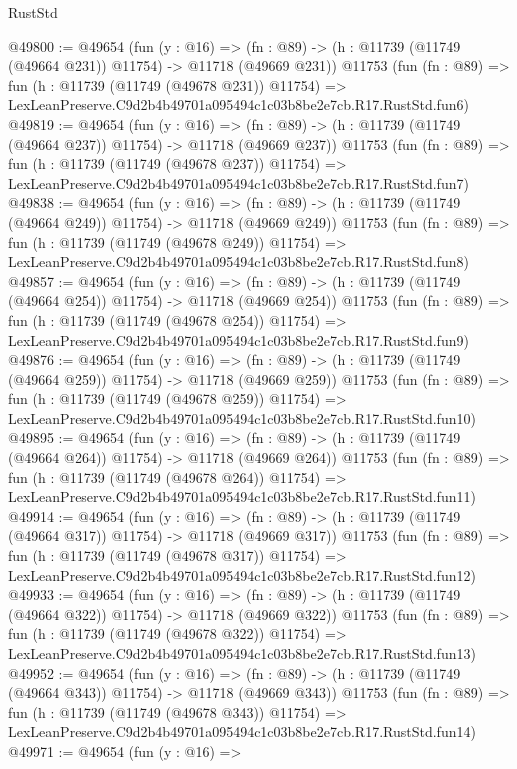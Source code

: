 \begin{lexlean}{RustStd}
\begin{coremodule}
@49800 := @49654
    (fun (y : @16) =>
    (fn : @89) -> (h : @11739 (@11749 (@49664 @231)) @11754) -> @11718 (@49669 @231))
    @11753
    (fun (fn : @89) =>
    fun (h : @11739 (@11749 (@49678 @231)) @11754) =>
    LexLeanPreserve.C9d2b4b49701a095494c1c03b8be2e7cb.R17.RustStd.fun6)
@49819 := @49654
    (fun (y : @16) =>
    (fn : @89) -> (h : @11739 (@11749 (@49664 @237)) @11754) -> @11718 (@49669 @237))
    @11753
    (fun (fn : @89) =>
    fun (h : @11739 (@11749 (@49678 @237)) @11754) =>
    LexLeanPreserve.C9d2b4b49701a095494c1c03b8be2e7cb.R17.RustStd.fun7)
@49838 := @49654
    (fun (y : @16) =>
    (fn : @89) -> (h : @11739 (@11749 (@49664 @249)) @11754) -> @11718 (@49669 @249))
    @11753
    (fun (fn : @89) =>
    fun (h : @11739 (@11749 (@49678 @249)) @11754) =>
    LexLeanPreserve.C9d2b4b49701a095494c1c03b8be2e7cb.R17.RustStd.fun8)
@49857 := @49654
    (fun (y : @16) =>
    (fn : @89) -> (h : @11739 (@11749 (@49664 @254)) @11754) -> @11718 (@49669 @254))
    @11753
    (fun (fn : @89) =>
    fun (h : @11739 (@11749 (@49678 @254)) @11754) =>
    LexLeanPreserve.C9d2b4b49701a095494c1c03b8be2e7cb.R17.RustStd.fun9)
@49876 := @49654
    (fun (y : @16) =>
    (fn : @89) -> (h : @11739 (@11749 (@49664 @259)) @11754) -> @11718 (@49669 @259))
    @11753
    (fun (fn : @89) =>
    fun (h : @11739 (@11749 (@49678 @259)) @11754) =>
    LexLeanPreserve.C9d2b4b49701a095494c1c03b8be2e7cb.R17.RustStd.fun10)
@49895 := @49654
    (fun (y : @16) =>
    (fn : @89) -> (h : @11739 (@11749 (@49664 @264)) @11754) -> @11718 (@49669 @264))
    @11753
    (fun (fn : @89) =>
    fun (h : @11739 (@11749 (@49678 @264)) @11754) =>
    LexLeanPreserve.C9d2b4b49701a095494c1c03b8be2e7cb.R17.RustStd.fun11)
@49914 := @49654
    (fun (y : @16) =>
    (fn : @89) -> (h : @11739 (@11749 (@49664 @317)) @11754) -> @11718 (@49669 @317))
    @11753
    (fun (fn : @89) =>
    fun (h : @11739 (@11749 (@49678 @317)) @11754) =>
    LexLeanPreserve.C9d2b4b49701a095494c1c03b8be2e7cb.R17.RustStd.fun12)
@49933 := @49654
    (fun (y : @16) =>
    (fn : @89) -> (h : @11739 (@11749 (@49664 @322)) @11754) -> @11718 (@49669 @322))
    @11753
    (fun (fn : @89) =>
    fun (h : @11739 (@11749 (@49678 @322)) @11754) =>
    LexLeanPreserve.C9d2b4b49701a095494c1c03b8be2e7cb.R17.RustStd.fun13)
@49952 := @49654
    (fun (y : @16) =>
    (fn : @89) -> (h : @11739 (@11749 (@49664 @343)) @11754) -> @11718 (@49669 @343))
    @11753
    (fun (fn : @89) =>
    fun (h : @11739 (@11749 (@49678 @343)) @11754) =>
    LexLeanPreserve.C9d2b4b49701a095494c1c03b8be2e7cb.R17.RustStd.fun14)
@49971 := @49654
    (fun (y : @16) =>

\end{coremodule}
\end{lexlean}
